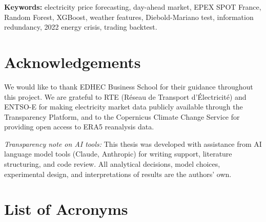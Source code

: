\documentclass[12pt, a4paper, oneside]{report}
\begin{document}
\vspace{1em}
\noindent\textbf{Keywords:} electricity price forecasting, day-ahead market,
EPEX SPOT France, Random Forest, XGBoost, weather features, Diebold-Mariano
test, information redundancy, 2022 energy crisis, trading backtest.

\chapter*{Acknowledgements}

We would like to thank EDHEC Business School for their guidance throughout this project. We are grateful to RTE (R\'{e}seau de Transport d'Électricit\'{e}) and ENTSO-E for making electricity market data publicly available through the Transparency Platform, and to the Copernicus Climate Change Service for providing open access to ERA5 reanalysis data.

\medskip
\noindent\textit{Transparency note on AI tools:} This thesis was developed with assistance from AI language model tools (Claude, Anthropic) for writing support, literature structuring, and code review. All analytical decisions, model choices, experimental design, and interpretations of results are the authors' own.

\tableofcontents
\listoffigures
\listoftables

\chapter*{List of Acronyms}
\begin{acronym}
\end{acronym}









\end{document}
